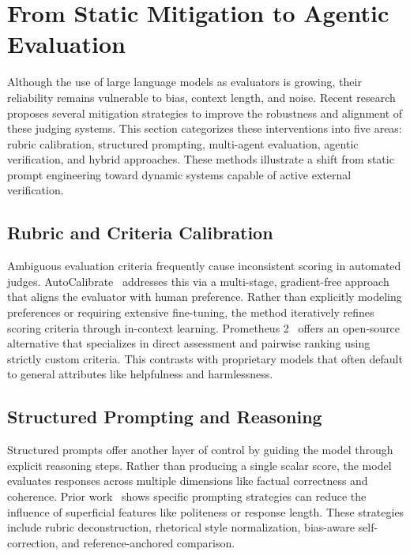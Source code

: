 \section{From Static Mitigation to Agentic Evaluation}
\label{sec:mitigation}

Although the use of large language models as evaluators is growing, their reliability remains vulnerable to bias, context length, and noise. Recent research proposes several mitigation strategies to improve the robustness and alignment of these judging systems. This section categorizes these interventions into five areas: rubric calibration, structured prompting, multi-agent evaluation, agentic verification, and hybrid approaches. These methods illustrate a shift from static prompt engineering toward dynamic systems capable of active external verification.

\subsection{Rubric and Criteria Calibration}
Ambiguous evaluation criteria frequently cause inconsistent scoring in automated judges. AutoCalibrate~\cite{autocalibrate} addresses this via a multi-stage, gradient-free approach that aligns the evaluator with human preference. Rather than explicitly modeling preferences or requiring extensive fine-tuning, the method iteratively refines scoring criteria through in-context learning. Prometheus 2~\cite{prometheus2} offers an open-source alternative that specializes in direct assessment and pairwise ranking using strictly custom criteria. This contrasts with proprietary models that often default to general attributes like helpfulness and harmlessness.

\subsection{Structured Prompting and Reasoning}
Structured prompts offer another layer of control by guiding the model through explicit reasoning steps. Rather than producing a single scalar score, the model evaluates responses across multiple dimensions like factual correctness and coherence. Prior work~\cite{comm_systems} shows specific prompting strategies can reduce the influence of superficial features like politeness or response length. These strategies include rubric deconstruction, rhetorical style normalization, bias-aware self-correction, and reference-anchored comparison.

